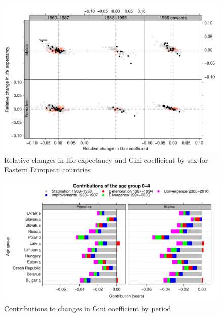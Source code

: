 \documentclass{article}
\begin{document}
\newpage

\begin{figure}[h!]
\caption{Relative changes in life expectancy and Gini coefficient by sex for Eastern European countries}
\centering
\begin{center}
\includegraphics[scale=.4]{Figures/F3_SS}
\end{center}
\end{figure}

\newpage

\begin{figure}[h!]
\caption{Contributions to changes in Gini coefficient by period}
\centering
\begin{center}
\includegraphics[scale=.6]{Figures/F6_SS_MalesInfant_Periods}
\end{center}
\end{figure}

\newpage
\end{document}
